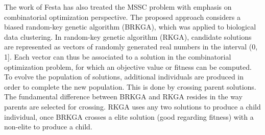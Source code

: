 The work of Festa \cite{Festa2013} has also treated the MSSC problem with emphasis on combinatorial optimization perspective. The proposed approach considers a biased random-key genetic algorithm (BRKGA), which was applied to biological data clustering. In random-key genetic algorithm (RKGA), candidate solutions are represented as vectors of randomly generated real numbers in the interval (0, 1]. Each vector can thus be associated to a solution in the combinatorial optimization problem, for which an objective value or fitness can be computed. To evolve the population of solutions, additional individuals are produced in order to complete the new population. This is done by crossing parent solutions. The fundamental difference between BRKGA and RKGA resides in the way parents are selected for crossing. RKGA uses any two solutions to produce a child individual, once BRKGA crosses a elite solution (good regarding fitness) with a non-elite to produce a child.



